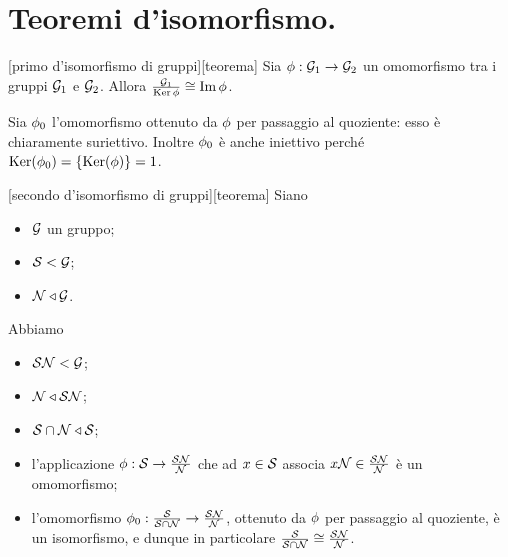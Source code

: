 \section{Teoremi d'isomorfismo.}\label{TeoremiDIsomorfismo}
\begin{Theorem}
[primo d'isomorfismo di gruppi][teorema]
	Sia $\phi: \mathcal{G}_1 \rightarrow \mathcal{G}_2$ un omomorfismo
	tra i gruppi $\mathcal{G}_1$ e $\mathcal{G}_2$. Allora
	$\frac{\mathcal{G}_1}{\operatorname{Ker}{\phi}} \cong \operatorname{Im}{\phi}$.
\end{Theorem}
\Proof
Sia $\phi_0$ l'omomorfismo ottenuto da $\phi$
per passaggio al quoziente: esso \`e chiaramente suriettivo.
Inoltre $\phi_0$ \`e anche iniettivo perch\'e
$\operatorname{Ker}(\phi_0) =
\lbrace \operatorname{Ker}(\phi) \rbrace = 1$.
\EndProof
\begin{Theorem}
[secondo d'isomorfismo di gruppi][teorema]
	Siano
	\begin{itemize}
		\item
		$\mathcal{G}$ un gruppo;
		\item
		$\mathcal{S} < \mathcal{G}$;
		\item
		$\mathcal{N} \triangleleft \mathcal{G}$.
	\end{itemize}
	Abbiamo
	\begin{itemize}
		\item
		$\mathcal{S}\mathcal{N} < \mathcal{G}$;
		\item
		$\mathcal{N} \triangleleft \mathcal{S}\mathcal{N}$;
		\item
		$\mathcal{S} \cap \mathcal{N} \triangleleft \mathcal{S}$;
		\item
		l'applicazione
		$\phi: \mathcal{S} \rightarrow
		\frac{\mathcal{S}\mathcal{N}}{\mathcal{N}}$
		che ad $x \in \mathcal{S}$ associa $x\mathcal{N} \in
		\frac{\mathcal{S}\mathcal{N}}{\mathcal{N}}$
		\`e un omomorfismo;
		\item
		l'omomorfismo $\phi_0:
		\frac{\mathcal{S}}{\mathcal{S} \cap \mathcal{N}} \rightarrow
		\frac{\mathcal{S}\mathcal{N}}{\mathcal{N}}$,
		ottenuto da $\phi$ per passaggio al quoziente,
		\`e un isomorfismo,
		e dunque in particolare
		$\frac{\mathcal{S}}{\mathcal{S} \cap \mathcal{N}} \cong \frac{\mathcal{S}\mathcal{N}}{\mathcal{N}}$.
		\end{itemize}
\end{Theorem}

